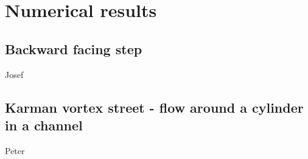 \chapter{Numerical results} %
\label{cha:numerical_results}

\section{Backward facing step} %
\label{sec:backward_facing_step}

Josef


\section{Karman vortex street - flow around a cylinder in a channel} %
\label{sec:karman_vortex_street_flow_around_a_cylinder_in_a_channel}

Peter


